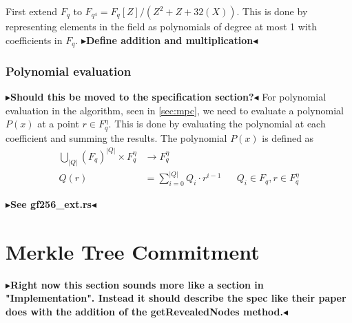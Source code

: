 \documentclass[twoside,11pt]{report}
\theoremstyle{definition}
\theoremstyle{plain}
\newcommand{\todo}[1]{{\color[rgb]{.5,0,0}\textbf{$\blacktriangleright$#1$\blacktriangleleft$}}}
\begin{document}
First extend $F_q$ to $F_{q^4} = F_q[Z] / (Z^2 + Z + 32(X))$. This is done by representing elements in the field as polynomials of degree at most 1 with coefficients in $F_q$. \todo{Define addition and multiplication}

\subsubsection{Polynomial evaluation}
\todo{Should this be moved to the specification section?}
For polynomial evaluation in the algorithm, seen in \autoref{sec:mpc}, we need to evaluate a polynomial $P(x)$ at a point $r \in F_q^\eta$. This is done by evaluating the polynomial at each coefficient and summing the results. The polynomial $P(x)$ is defined as
\begin{align}
  \textstyle\bigcup_{|Q|}(F_q)^{|Q|} \times F_q^\eta & \rightarrow F_q^\eta                 \nonumber                                                    \\
  Q(r)                                               & = \textstyle\sum_{i=0}^{|Q|} Q_i \cdot r^{i-1} &  & Q_i \in F_q, r \in F_q^\eta\label{eq:mpcpoly}
\end{align}

\todo{See gf256\_ext.rs}

\section{Merkle Tree Commitment}

\todo{Right now this section sounds more like a section in "Implementation". Instead it should describe the spec like their paper does with the addition of the getRevealedNodes method.}
\end{document}
